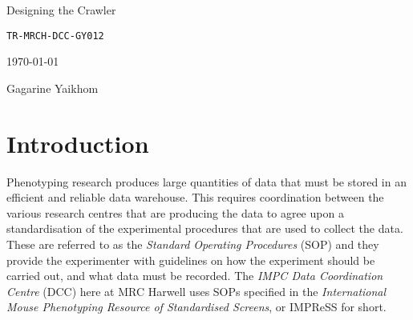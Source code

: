 \documentclass[a4paper,11pt]{article}
\newcommand{\mytitle}{Designing the Crawler}
\newcommand{\theauthor}{Gagarine Yaikhom}
\newcommand{\trid}{{\tt TR-MRCH-DCC-GY012}}
\begin{document}
\begin{titlepage}
\centering

\vspace*{3.5cm}

\huge{\mytitle}

\vspace*{1.5cm}

\large{\tt \trid}

\smallskip

\large{\today}

\vspace*{1.5cm}

\large{\theauthor}

\vfill

\begin{abstract}
The {\sl IMPC Data Coordination Centre} provides computational services that simplify the collection, collation, storage, retrieval and analysis of phenotype data. The primary objective of the data upload and quality control interfaces is to provide a consistent and interactive centralised management system for tracking the collection of data from various research centres, and for carrying out quality control over the collected data before they are made available to the general public and to researchers throughout the world. In this report, we discuss the design of the crawler and associated tracking system that is currently deployed at the Data Coordination Centre. This report does not address areas related to the quality control system or the tracker web interface. 
\end{abstract}

\vfill

\vfill


\end{titlepage}

\section{Introduction}
Phenotyping research produces large quantities of data that must be stored in an efficient and reliable data warehouse. This requires coordination between the various research centres that are producing the data to agree upon a standardisation of the experimental procedures that are used to collect the data. These are referred to as the {\sl Standard Operating Procedures} (SOP) and they provide the experimenter with guidelines on how the experiment should be carried out, and what data must be recorded. The {\sl IMPC Data Coordination Centre} (DCC) here at MRC Harwell uses SOPs specified in the {\sl International Mouse Phenotyping Resource of Standardised Screens}, or IMPReSS for short.
\end{document}
